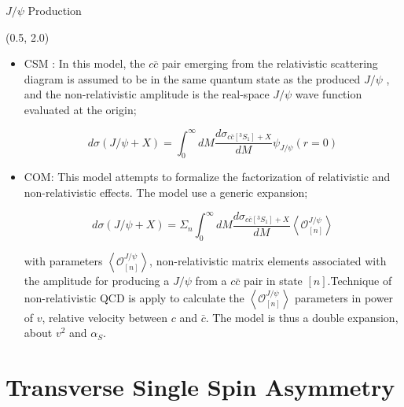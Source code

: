 \documentclass[10pt, xcolor={dvipsnames}, aspectratio = 169]{beamer}
\newcommand{\jpsi}{$J/\psi$ }
\begin{document}
\begin{frame}{\jpsi Production}

\begin{textblock}{14.0}(0.5, 2.0)
\begin{itemize}

\item CSM : In this model, the $c\bar{c}$ pair emerging from the relativistic scattering diagram is assumed to be in the
same quantum state as the produced \jpsi, and the non-relativistic amplitude is the real-space \jpsi wave function
evaluated at the origin;

\begin{equation*}
d\sigma (J/\psi+X) = \int_{0}^{\infty} dM \frac{d\sigma_{c\bar{c}[^{3}S_{1}] + X}}{dM} \psi_{J/\psi} (r=0)
\end{equation*}

\item COM: This model attempts to formalize the factorization of relativistic and non-relativistic effects. The model use
a generic expansion;

\begin{equation*}
d\sigma (J/\psi+X) = \Sigma_{n} \int_{0}^{\infty} dM \frac{d\sigma_{c\bar{c}[^{3}S_{1}] + X}}{dM} \left<\mathcal{O}^{J/\psi}_{[n]}\right>
\end{equation*}

with parameters $\left<\mathcal{O}^{J/\psi}_{[n]}\right>$, non-relativistic matrix elements associated with the amplitude
for producing a \jpsi from a $c\bar{c}$ pair in state $[n]$.Technique of non-relativistic QCD is apply to calculate the
$\left<\mathcal{O}^{J/\psi}_{[n]}\right>$ parameters in power of $v$, relative velocity between $c$ and $\bar{c}$.
The model is thus a double expansion, about $v^{2}$ and $\alpha_{S}$.

\end{itemize}
\end{textblock}

\end{frame}

%
%
\section{Transverse Single Spin Asymmetry}
\end{document}

